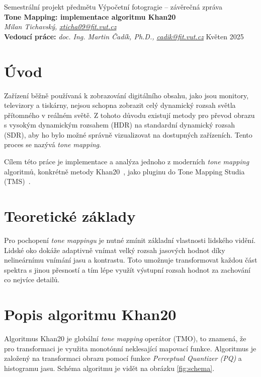 \documentclass[11pt,a4paper,oneside]{article}
\begin{document}
\thispagestyle{empty}
\begin{center}
\vspace*{60mm}
{Semestrální projekt předmětu Výpočetní fotogragie -- závěrečná zpráva }\\
\smallskip
{\Large\bf Tone Mapping: implementace algoritmu Khan20}\\
\smallskip
{\it Milan Tichavský, \url{xticha09@fit.vut.cz}}\\
\vfill
{\bf Vedoucí práce:} {\it doc. Ing. Martin Čadík, Ph.D., \url{cadik@fit.vut.cz}} 
\hfill {Květen 2025}


\end{center}
\newpage


\section{Úvod}

Zařízení běžně používaná k zobrazování digitálního obsahu, jako jsou monitory,
televizory a tiskárny, nejsou schopna zobrazit celý dynamický rozsah světla
přítomného v reálném světě. Z tohoto důvodu existují metody pro převod obrazu s
vysokým dynamickým rozsahem (HDR) na standardní dynamický rozsah (SDR), aby ho bylo
možné správně vizualizovat na dostupných zařízeních. Tento proces se nazývá
\emph{tone mapping}.

Cílem této práce je implementace a analýza jednoho z moderních \emph{tone
mapping} algoritmů, konkrétně metody Khan20~\cite{Khan2020}, jako pluginu do Tone Mapping
Studia (TMS)~\cite{TMS2025}.

\section{Teoretické základy}

Pro pochopení \emph{tone mappingu} je nutné zmínit základní vlastnosti lidského
vidění. Lidské oko dokáže adaptivně vnímat velký rozsah jasových hodnot díky
nelineárnímu vnímání jasu a kontrastu. Toto umožnuje transformovat každou část
spektra s jinou přesností a tím lépe využít výstupní rozsah hodnot za zachování
co nejvíce detailů.

\section{Popis algoritmu Khan20}

Algoritmus Khan20 je globální \emph{tone mapping} operátor (TMO), to znamená, že pro
transformaci je využita monotónní neklesající mapovací funkce. 
Algoritmus je založený na transformaci obrazu pomocí funkce \textit{Perceptual
Quantizer (PQ)} a histogramu jasu. Schéma algoritmu je vidět na obrázku
\ref{fig:schema}.
\end{document}
